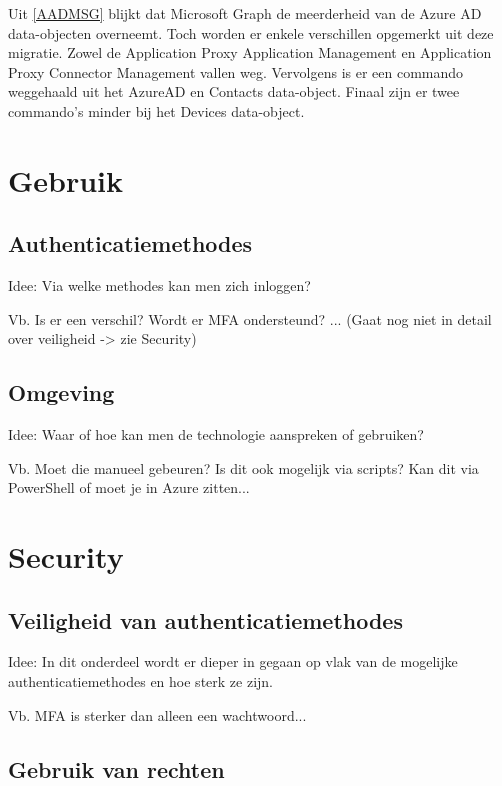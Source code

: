 Uit \ref{AADMSG} blijkt dat Microsoft Graph de meerderheid van de Azure \ac{AD} data-objecten overneemt. Toch worden er enkele verschillen opgemerkt uit deze migratie. Zowel de Application Proxy Application Management en Application Proxy Connector Management vallen weg. Vervolgens is er een commando weggehaald uit het AzureAD en Contacts data-object. Finaal zijn er twee commando's minder bij het Devices data-object. \\

\section{Gebruik}

\subsection{Authenticatiemethodes}

Idee: Via welke methodes kan men zich inloggen? 

Vb. Is er een verschil? Wordt er MFA ondersteund? ... (Gaat nog niet in detail over veiligheid -> zie Security)

\subsection{Omgeving}

Idee: Waar of hoe kan men de technologie aanspreken of gebruiken?

Vb. Moet die manueel gebeuren? Is dit ook mogelijk via scripts? Kan dit via PowerShell of moet je in Azure zitten...


\section{Security}

\subsection{Veiligheid van authenticatiemethodes}

Idee: In dit onderdeel wordt er dieper in gegaan op vlak van de mogelijke authenticatiemethodes en hoe sterk ze zijn.

Vb. MFA is sterker dan alleen een wachtwoord...

\subsection{Gebruik van rechten}




